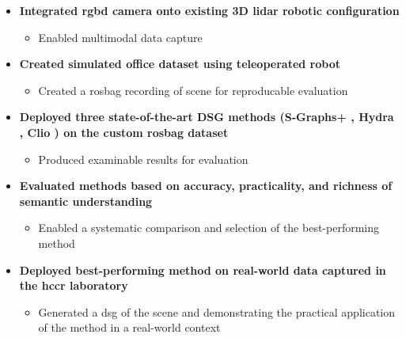 \begin{itemize}
  \item  \textbf{Integrated \acrshort{rgbd} camera onto existing 3D \acrshort{lidar} robotic configuration}
    \begin{itemize}
      \item Enabled multimodal data capture
    \end{itemize}
  \item \textbf{Created simulated office dataset using teleoperated robot}
    \begin{itemize}
      \item Created a rosbag recording of scene for reproducable evaluation
    \end{itemize}
  \item \textbf{Deployed three state-of-the-art DSG methods (S-Graphs+ \cite{s_graphs_plus}, Hydra \cite{hydra}, Clio \cite{clio}) on the custom rosbag dataset}
    \begin{itemize}
      \item Produced examinable results for evaluation
    \end{itemize}
  \item \textbf{Evaluated methods based on accuracy, practicality, and richness of semantic understanding}
    \begin{itemize}
      \item Enabled a systematic comparison and selection of the best-performing method
    \end{itemize}
  \item \textbf{Deployed best-performing method on real-world data captured in the \gls{hccr} laboratory}
    \begin{itemize}
      \item Generated a \gls{dsg} of the scene and demonstrating the practical application of the method in a real-world context
    \end{itemize}
\end{itemize}


